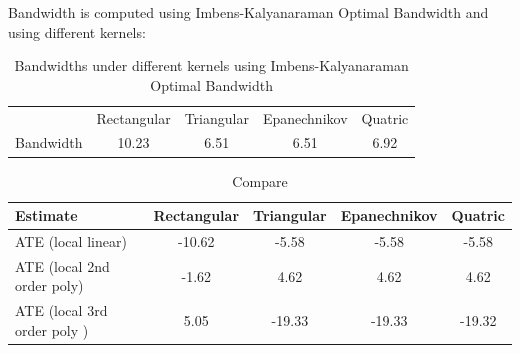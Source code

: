 \documentclass[a4paper]{article}
\begin{document}
\noindent Bandwidth is computed using Imbens-Kalyanaraman Optimal Bandwidth and using different kernels: 

\begin{table}[ht!]\centering
	\caption{Bandwidths under different kernels using Imbens-Kalyanaraman Optimal Bandwidth}
	\begin{tabular}{lcccc}
		\hline
	& Rectangular & Triangular & Epanechnikov & Quatric \\
	Bandwidth & 10.23 & 6.51 & 6.51 & 6.92 \\ 	 
	\hline
	\end{tabular}
\end{table}

\begin{table}[ht!]\centering
	\caption{Compare}
	\begin{tabular}{lcccc}
		\hline
		Estimate & Rectangular & Triangular & Epanechnikov & Quatric \\
		\hline
		ATE (local linear)& -10.62 & -5.58 & -5.58 & -5.58 \\
		ATE (local 2nd order poly)& -1.62 & 4.62 &  4.62 & 4.62 \\
		ATE (local 3rd order poly )& 5.05 & -19.33 & -19.33 & -19.32 \\
		\hline
	\end{tabular}
\end{table}
\end{document}
